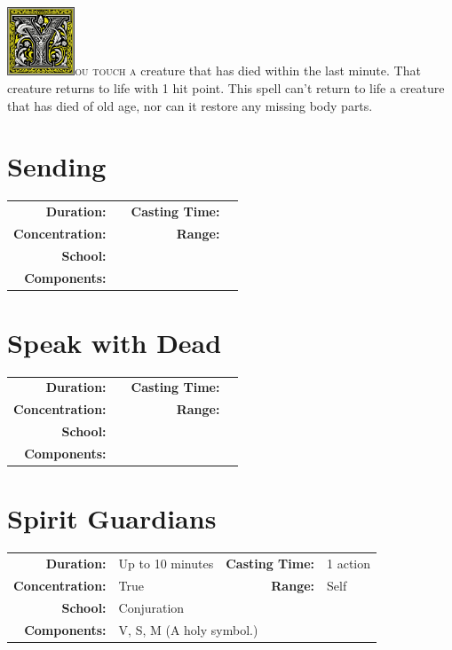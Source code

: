 \documentclass[12pt,showtrims]{memoir}
\begin{document}
\vspace{1\baselineskip}\noindent 
\lettrine[lines=4]{\includegraphics[height=58pt]{initials/Y.png}}{ou touch a} creature that has died within the last minute. That creature returns to life with 1 hit point. This spell can't return to life a creature that has died of old age, nor can it restore any missing body parts.

\newpage
\section*{Sending}
{
\small\centering\vspace{-6pt}
\begin{tabular}{rlrl}
\toprule

\textbf{Duration:} &  &
\textbf{Casting Time:} &  \\
\textbf{Concentration:} & &
\textbf{Range:} &  \\
\textbf{School:} &  \\
\textbf{Components:} & \multicolumn{3}{p{0.7\textwidth}}{}\\

\bottomrule
\end{tabular}
}
\newpage
\section*{Speak with Dead}
{
\small\centering\vspace{-6pt}
\begin{tabular}{rlrl}
\toprule

\textbf{Duration:} &  &
\textbf{Casting Time:} &  \\
\textbf{Concentration:} & &
\textbf{Range:} &  \\
\textbf{School:} &  \\
\textbf{Components:} & \multicolumn{3}{p{0.7\textwidth}}{}\\

\bottomrule
\end{tabular}
}
\newpage
\section*{Spirit Guardians}

{
\small\centering\vspace{-6pt}
\begin{tabular}{rlrl}
\toprule

\textbf{Duration:} & Up to 10 minutes &
\textbf{Casting Time:} & 1 action \\
\textbf{Concentration:} & True &
\textbf{Range:} & Self \\
\textbf{School:} & Conjuration \\
\textbf{Components:} & \multicolumn{3}{p{0.7\textwidth}}{V, S, M (A holy symbol.)}\\

\bottomrule
\end{tabular}
}
\end{document}
